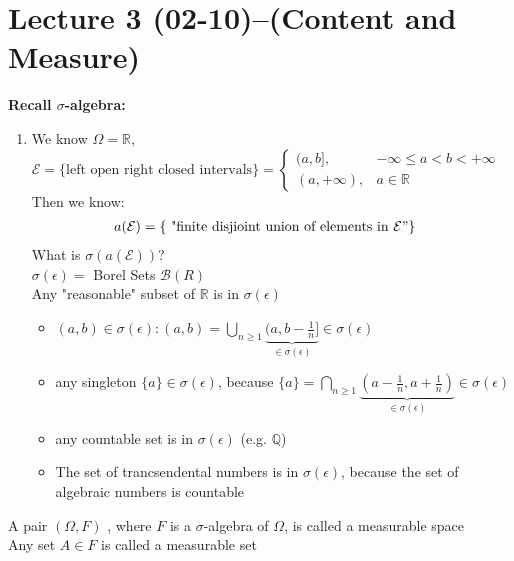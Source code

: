 \section{Lecture 3 (02-10)--(Content and Measure)}
\textbf{Recall $ \sigma $-algebra:}
\begin{example}[]{}
 \begin{enumerate}[label=\circled{\arabic*}] 
 \item We know $\Omega = \mathbb{R}$, \\$\mathcal{E} = \{\text{left open right closed intervals}\} = 
\begin{cases}
    (a,b], & -\infty \leq a < b < +\infty \\
    (a,+\infty),&a\in \mathbb{R}
\end{cases}$
\\Then we know:\begin{align*}a(\mathcal{E})&=\{\text{  "finite disjioint union of elements in }\mathcal{E}"\}
\end{align*}
What is $ \sigma(a(\mathcal{E})) $?
\\$\sigma(\epsilon)=$ Borel Sets $\mathcal{B}(R)$ 
\\Any "reasonable" subset of $ \mathbb{R} $ is in $ \sigma(\epsilon) $
\begin{itemize}
\item $(a,b)\in \sigma(\epsilon): (a,b)=\bigcup_{n\geq1}\underbrace{(a,b-\frac{1}{n}]}_{\in \sigma(\epsilon)}\in \sigma(\epsilon)$
\item any singleton $\{a\}\in \sigma(\epsilon)$, because $\{a\}=\bigcap_{n\geq1}\underbrace{(a-\frac{1}{n},a+\frac{1}{n})}_{\in \sigma(\epsilon)}\in \sigma(\epsilon)$
\item any countable set is in $\sigma(\epsilon)$ (e.g. $\mathbb{Q}$)
\item The set of trancsendental numbers is in $\sigma(\epsilon)$, because the set of algebraic numbers is countable
\end{itemize}
 \end{enumerate}
\end{example}
\begin{definition}{}
A pair $ (\Omega, F) $ , where $F$ is a $ \sigma $-algebra of $ \Omega $, is called a measurable space 
\\Any set $ A\in F $  is called a measurable set
\end{definition}
